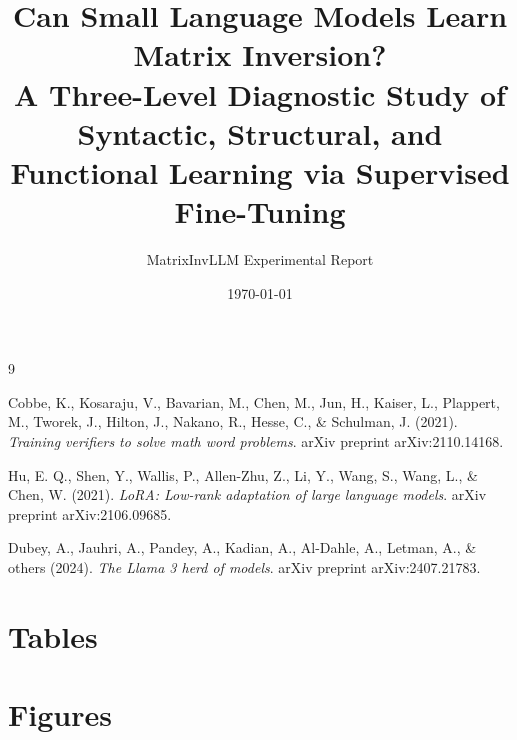 \documentclass[11pt, a4paper]{article}
\title{Can Small Language Models Learn Matrix Inversion? \\
\large A Three-Level Diagnostic Study of Syntactic, Structural, and Functional Learning via Supervised Fine-Tuning}
\author{MatrixInvLLM Experimental Report}
\date{\today}
\begin{document}
\maketitle



\newpage
\tableofcontents
\newpage











\begin{thebibliography}{9}

Cobbe, K., Kosaraju, V., Bavarian, M., Chen, M., Jun, H., Kaiser, L., Plappert, M., Tworek, J., Hilton, J., Nakano, R., Hesse, C., \& Schulman, J. (2021).
\textit{Training verifiers to solve math word problems}.
arXiv preprint arXiv:2110.14168.

Hu, E. Q., Shen, Y., Wallis, P., Allen-Zhu, Z., Li, Y., Wang, S., Wang, L., \& Chen, W. (2021).
\textit{LoRA: Low-rank adaptation of large language models}.
arXiv preprint arXiv:2106.09685.

Dubey, A., Jauhri, A., Pandey, A., Kadian, A., Al-Dahle, A., Letman, A., \& others (2024).
\textit{The Llama 3 herd of models}.
arXiv preprint arXiv:2407.21783.

\end{thebibliography}

\newpage
\appendix

\section{Tables}



\vspace{1cm}



\vspace{1cm}



\newpage
\section{Figures}



\vspace{1cm}


\end{document}

